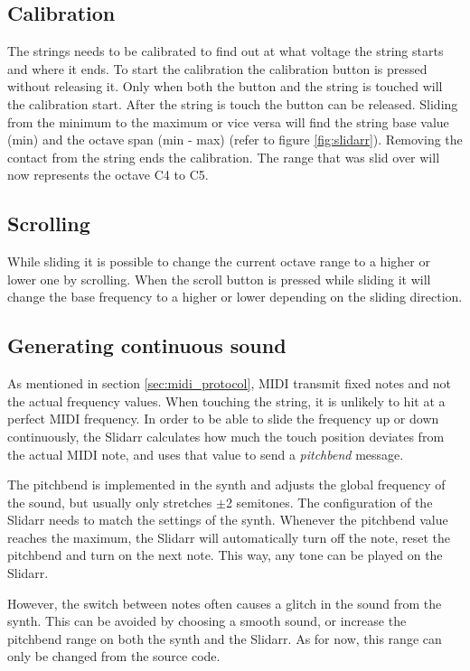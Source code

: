 \documentclass{article}
\begin{document}
\subsection{Calibration}
The strings needs to be calibrated to find out at what voltage the string starts and where it ends. To start the calibration the calibration button is pressed without releasing it. Only when both the button and the string is touched will the calibration start. After the string is touch the button can be released. Sliding from the minimum to the maximum or vice versa will find the string base value (min) and the octave span (min - max) (refer to figure \ref{fig:slidarr}). Removing the contact from the string ends the calibration. The range that was slid over will now represents the octave C4 to C5.

\subsection{Scrolling}
While sliding it is possible to change the current octave range to a higher or lower one by scrolling. When the scroll button is pressed while sliding it will change the base frequency to a higher or lower depending on the sliding direction.

\subsection{Generating continuous sound}
As mentioned in section \ref{sec:midi_protocol}, MIDI transmit fixed notes and not the actual frequency values. When touching the string, it is unlikely to hit at a perfect MIDI frequency. In order to be able to slide the frequency up or down continuously, the Slidarr calculates how much the touch position deviates from the actual MIDI note, and uses that value to send a \textit{pitchbend} message. 

The pitchbend is implemented in the synth and adjusts the global frequency of the sound, but usually only stretches $\pm$2 semitones. The configuration of the Slidarr needs to match the settings of the synth. Whenever the pitchbend value reaches the maximum, the Slidarr will automatically turn off the note, reset the pitchbend and turn on the next note. This way, any tone can be played on the Slidarr.

However, the switch between notes often causes a glitch in the sound from the synth. This can be avoided by choosing a smooth sound, or increase the pitchbend range on both the synth and the Slidarr. As for now, this range can only be changed from the source code.
\end{document}
